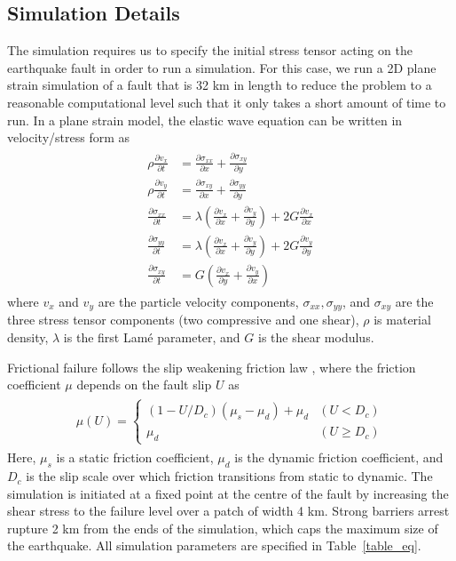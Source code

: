 \documentclass[openacc]{rstransa}%
\begin{document}
\subsection{Simulation Details}

The simulation requires us to specify the initial stress tensor acting on the earthquake fault in order to run a
simulation. For this case, we run a 2D plane strain simulation of a fault that is 32 km in length
to reduce the problem to a reasonable
computational level such that it only takes a short amount of time to run. In a plane strain model, the
elastic wave equation can be written in velocity/stress form as
\begin{align}\label{elasticwave}
\begin{split}
\rho\frac{\partial v_x}{\partial t} &= \frac{\partial \sigma_{xx}}{\partial x} + \frac{\partial \sigma_{xy}}{\partial y}\\
\rho\frac{\partial v_y}{\partial t} &= \frac{\partial \sigma_{xy}}{\partial x} + \frac{\partial \sigma_{yy}}{\partial y}\\
\frac{\partial \sigma_{xx}}{\partial t} &= \lambda\left(\frac{\partial v_x}{\partial x} + \frac{\partial v_y}{\partial y}\right) + 2G \frac{\partial v_x}{\partial x}\\
\frac{\partial \sigma_{yy}}{\partial t} &= \lambda\left(\frac{\partial v_x}{\partial x} + \frac{\partial v_y}{\partial y}\right) + 2G \frac{\partial v_y}{\partial y}\\
\frac{\partial \sigma_{xy}}{\partial t} &= G \left(\frac{\partial v_x}{\partial y} + \frac{\partial v_y}{\partial x} \right)
\end{split}
\end{align}
where $v_x$ and $v_y$ are the particle velocity components, $\sigma_{xx}, \sigma_{yy}$, and $\sigma_{xy}$
are the three stress tensor components (two compressive and one shear), $\rho$ is material
density, $\lambda$ is the first Lam\'{e} parameter, and $G$ is the shear modulus.

Frictional failure follows the slip weakening friction law \cite{slipweak}, where the friction coefficient $\mu$ depends
on the fault slip $U$ as
\begin{align}\label{slipweak}
\begin{split}
\mu(U) = \begin{cases}(1 - U/D_c)(\mu_s-\mu_d) + \mu_d & (U < D_c) \\ \mu_d & (U \geq D_c) \end{cases}
\end{split}
\end{align}
Here, $\mu_s$ is a static friction coefficient, $\mu_d$ is the dynamic friction coefficient, and $D_c$
is the slip scale over which friction transitions from static to dynamic. The simulation is initiated
at a fixed point at the centre of the fault by increasing the shear stress to the failure level over
a patch of width 4 km. Strong barriers arrest rupture 2 km from the ends of the simulation, which
caps the maximum size of the earthquake. All simulation parameters
are specified in Table~\ref{table_eq}.
\end{document}
